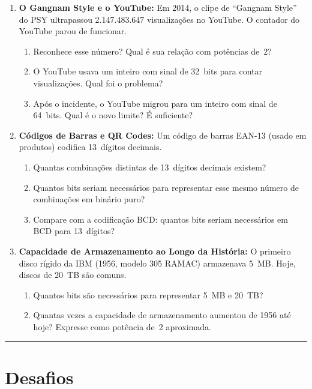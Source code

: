 \documentclass[11pt, a4paper]{article}
\begin{document}
\begin{enumerate}
\item \textbf{O Gangnam Style e o YouTube:} Em 2014, o clipe de ``Gangnam Style'' do PSY ultrapassou 2.147.483.647 visualiza\c{c}\~{o}es no YouTube. O contador do YouTube parou de funcionar.
\begin{enumerate}
  \item Reconhece esse n\'{u}mero? Qual \'{e} sua rela\c{c}\~{a}o com pot\^{e}ncias de~2?
  \item O YouTube usava um inteiro com sinal de 32~bits para contar visualiza\c{c}\~{o}es. Qual foi o problema?
  \item Ap\'{o}s o incidente, o YouTube migrou para um inteiro com sinal de 64~bits. Qual \'{e} o novo limite? \'{E} suficiente?
\end{enumerate}

\newpage
\item \textbf{C\'{o}digos de Barras e QR Codes:} Um c\'{o}digo de barras EAN-13 (usado em produtos) codifica 13~d\'{i}gitos decimais.
\begin{enumerate}
  \item Quantas combina\c{c}\~{o}es distintas de 13~d\'{i}gitos decimais existem?
  \item Quantos bits seriam necess\'{a}rios para representar esse mesmo n\'{u}mero de combina\c{c}\~{o}es em bin\'{a}rio puro?
  \item Compare com a codifica\c{c}\~{a}o BCD: quantos bits seriam necess\'{a}rios em BCD para 13~d\'{i}gitos?
\end{enumerate}

\item \textbf{Capacidade de Armazenamento ao Longo da Hist\'{o}ria:} O primeiro disco r\'{i}gido da IBM (1956, modelo 305 RAMAC) armazenava 5~MB. Hoje, discos de 20~TB s\~{a}o comuns.
\begin{enumerate}
  \item Quantos bits s\~{a}o necess\'{a}rios para representar 5~MB e 20~TB?
  \item Quantas vezes a capacidade de armazenamento aumentou de 1956 at\'{e} hoje? Expresse como pot\^{e}ncia de~2 aproximada.
\end{enumerate}

\end{enumerate}

\vspace{8pt}
\hrule
\vspace{8pt}

\section*{Desafios}
\end{document}
